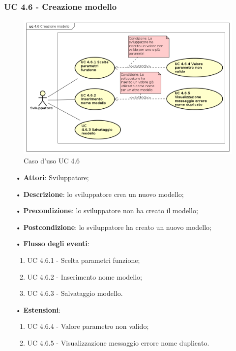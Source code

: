 \subsubsection{UC 4.6 - Creazione modello}
\begin{figure}[H]
	\centering
	\includegraphics[width=17cm, keepaspectratio]{img/UC460.png} 
	\caption{Caso d'uso UC 4.6}\label{fig:460}
\end{figure}
\begin{itemize}
	\item[•]\textbf{Attori}: Sviluppatore;
	\item[•]\textbf{Descrizione}: lo sviluppatore crea un nuovo modello;
	\item[•]\textbf{Precondizione}: lo sviluppatore non ha creato il modello;
	\item[•]\textbf{Postcondizione}: lo sviluppatore ha creato un nuovo modello;
	\item[•]\textbf{Flusso degli eventi}:  
	\begin{enumerate}
		\item UC 4.6.1 - Scelta parametri funzione;
		\item UC 4.6.2 - Inserimento nome modello;
		\item UC 4.6.3 - Salvataggio modello.
	\end{enumerate}
	\item[•]\textbf{Estensioni}:  
	\begin{enumerate}
		\item UC 4.6.4 - Valore parametro non valido;
		\item UC 4.6.5 - Visualizzazione messaggio errore nome duplicato.
	\end{enumerate}
\end{itemize}

